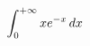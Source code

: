 \documentclass[preview]{standalone}
\begin{document}
\begin{align*}
\special{dvisvgm:raw <g id='unique000'>}\displaystyle\int_0^{+\infty}xe^{-x}\,dx\special{dvisvgm:raw </g>}
\end{align*}
\end{document}
